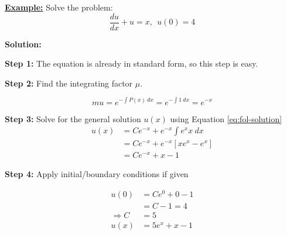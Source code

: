 \vspace{1cm}
\underline{\textbf{Example:}}
Solve the problem:
$$\frac{du}{dx}+u=x, \ \ u(0) = 4$$

\textbf{Solution:}

\textbf{Step 1:}
The equation is already in standard form, so this step is easy.

\vspace{0.25cm}
\textbf{Step 2:} Find the integrating factor $\mu$.

$$mu = e^{-\int P(x) \ dx} = e^{-\int 1 \ dx} = e^{-x}$$

\vspace{0.25cm}
\textbf{Step 3:} Solve for the general solution $u(x)$ using Equation \ref{eq:fol-solution}
\begin{align*}
u(x) &= Ce^{-x}+e^{-x}\int e^{x}x \ dx \\
&= Ce^{-x} + e^{-x}\left[xe^{x}-e^{x} \right] \\
&= Ce^{-x} + x - 1
\end{align*}

\vspace{0.25cm}
\textbf{Step 4:} Apply initial/boundary conditions if given

\begin{align*}
u(0) &= Ce^{0} + 0 -1 \\
 &=C-1 = 4 \\
 \Rightarrow C &= 5 \\
 u(x) &= 5e^x+x-1
\end{align*}



